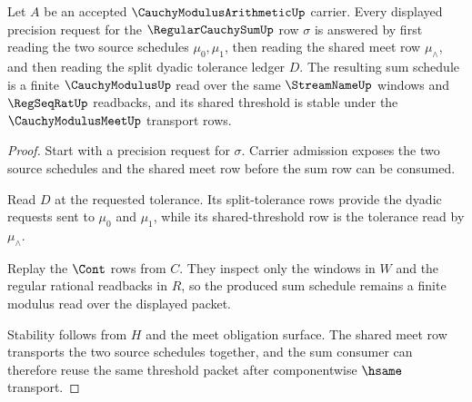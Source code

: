 \begin{theorem}
\label{thm:cauchy-modulus-arithmetic-sum-meet-closure}
Let $A$ be an accepted $\CauchyModulusArithmeticUp$ carrier. Every displayed
precision request for the $\RegularCauchySumUp$ row $\sigma$ is answered by
first reading the two source schedules $\mu_0,\mu_1$, then reading the shared
meet row $\mu_{\wedge}$, and then reading the split dyadic tolerance ledger
$D$. The resulting sum schedule is a finite $\CauchyModulusUp$ read over the
same $\StreamNameUp$ windows and $\RegSeqRatUp$ readbacks, and its shared
threshold is stable under the $\CauchyModulusMeetUp$ transport rows.
\end{theorem}
\begin{proof}
Start with a precision request for $\sigma$. Carrier admission exposes the two
source schedules and the shared meet row before the sum row can be consumed.

Read $D$ at the requested tolerance. Its split-tolerance rows provide the
dyadic requests sent to $\mu_0$ and $\mu_1$, while its shared-threshold row is
the tolerance read by $\mu_{\wedge}$.

Replay the $\Cont$ rows from $C$. They inspect only the windows in $W$ and the
regular rational readbacks in $R$, so the produced sum schedule remains a
finite modulus read over the displayed packet.

Stability follows from $H$ and the meet obligation surface. The shared meet
row transports the two source schedules together, and the sum consumer can
therefore reuse the same threshold packet after componentwise $\hsame$
transport.
\end{proof}

